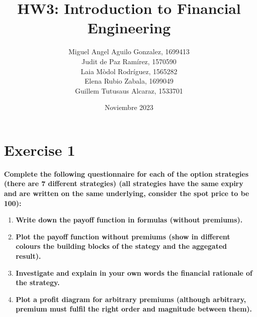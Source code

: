 \documentclass[a4paper,]{article}
\title{\textbf{HW3: Introduction to Financial Engineering}}
\author{Miguel Angel Aguilo Gonzalez, 1699413 \\ Judit de Paz Ramírez, 1570590 \\ Laia Mòdol Rodríguez, 1565282 \\ Elena Rubio Zabala, 1699049 \\ Guillem Tutusaus Alcaraz, 1533701 }
\date{Noviembre 2023}
\begin{document}
\maketitle
\newpage

\section*{Exercise 1}
\textbf{Complete the following questionnaire for each of the option strategies (there are 7 different strategies) (all strategies have the same expiry and are written on the same underlying, consider the spot price to be 100):}

\begin{enumerate}
    \item \textbf{Write down the payoff function in formulas (without premiums).}
    \item \textbf{Plot the payoff function without premiums (show in different colours the building blocks of the stategy and the aggegated result).}
    \item \textbf{Investigate and explain in your own words the financial rationale of the strategy.}
    \item \textbf{Plot a profit diagram for arbitrary premiums (although arbitrary, premium must fulfil the right order and magnitude between them).}
\end{enumerate}
\end{document}
